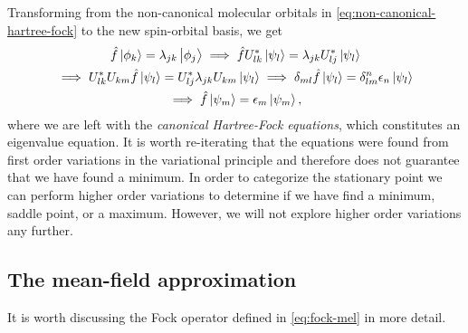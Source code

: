             Transforming from the non-canonical molecular orbitals in
            \autoref{eq:non-canonical-hartree-fock} to the new spin-orbital
            basis, we get
            \begin{gather}
                \hat{f}\ket{\phi_k} = \lambda_{jk}\ket{\phi_j}
                \implies
                \hat{f} U^{*}_{lk}\ket{\psi_{l}}
                = \lambda_{jk} U^{*}_{lj} \ket{\psi_l}
                \\
                \implies
                U^{*}_{lk} U_{km} \hat{f}\ket{\psi_l}
                = U^{*}_{lj} \lambda_{jk} U_{km} \ket{\psi_l}
                \implies
                \delta_{ml} \hat{f} \ket{\psi_l}
                = \delta^{n}_{lm} \epsilon_{n} \ket{\psi_l}
                \\
                \implies
                \hat{f}\ket{\psi_m}
                = \epsilon_{m} \ket{\psi_m},
                \label{eq:canonical-hartree-fock}
            \end{gather}
            where we are left with the \emph{canonical Hartree-Fock equations},
            which constitutes an eigenvalue equation.
            It is worth re-iterating that the equations were found from first
            order variations in the variational principle and therefore does not
            guarantee that we have found a minimum.
            In order to categorize the stationary point we can perform higher order
            variations to determine if we have find a minimum, saddle point, or
            a maximum.
            However, we will not explore higher order variations any further.

        \subsection{The mean-field approximation}
            It is worth discussing the Fock operator defined in
            \autoref{eq:fock-mel} in more detail.

